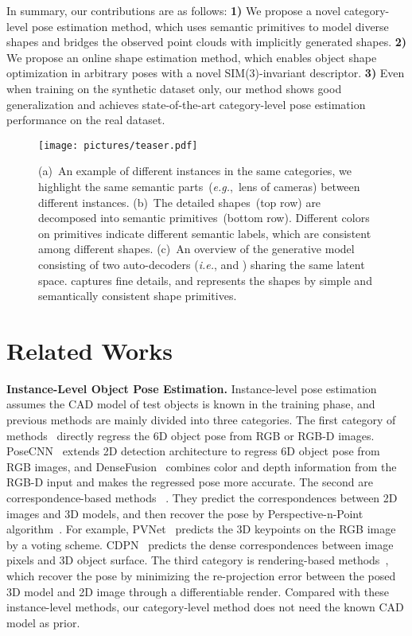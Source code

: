 \documentclass{article}
\begin{document}
In summary, our contributions are as follows:
\textbf{1)}
We propose a novel category-level pose estimation method, which uses semantic primitives to model diverse shapes and bridges the observed point clouds with implicitly generated shapes.
\textbf{2)}
We propose an online shape estimation method, which enables object shape optimization in arbitrary poses with a novel SIM(3)-invariant descriptor.
\textbf{3)}
Even when training on the synthetic dataset only, our method shows good generalization and achieves state-of-the-art category-level pose estimation performance on the real dataset.

\begin{figure}
    \centering
    \setlength{\abovecaptionskip}{0.cm}
    \texttt{[image: pictures/teaser.pdf]}
    \caption{(a)~An example of different instances in the same categories, we highlight the same semantic parts~(\emph{e.g.},~lens of cameras) between different instances.
    (b)~The detailed shapes~(top row) are decomposed into semantic primitives~(bottom row). Different colors on primitives indicate different semantic labels, which are consistent among different shapes.
    (c)~An overview of the generative model consisting of two auto-decoders (\emph{i.e.},  and ) sharing the same latent space.  captures fine details, and  represents the shapes by simple and semantically consistent shape primitives. }
    \label{fig:teaser}
\vspace{-0.4cm}
\end{figure}
 \section{Related Works}
\textbf{Instance-Level Object Pose Estimation.}
Instance-level pose estimation assumes the CAD model of test objects is known in the training phase, and previous methods are mainly divided into three categories. The first category of methods~\cite{schwarz2015rgb,wang2019densefusion,xiang2017posecnn,kehl2017ssd} directly regress the 6D object pose from RGB or RGB-D images. PoseCNN~\cite{xiang2017posecnn} extends 2D detection architecture to regress 6D object pose from RGB images, and DenseFusion~\cite{wang2019densefusion} combines color and depth information from the RGB-D input and makes the regressed pose more accurate. The second are correspondence-based methods ~\cite{peng2019pvnet,he2020pvn3d,li2019cdpn,oberweger2018making}. They predict the correspondences between 2D images and 3D models, and then recover the pose by Perspective-n-Point algorithm~\cite{lepetit2009epnp}. For example, PVNet~\cite{peng2019pvnet} predicts the 3D keypoints on the RGB image by a voting scheme. CDPN~\cite{li2019cdpn} predicts the dense correspondences between image pixels and 3D object surface. The third category is rendering-based methods~\cite{park2020latentfusion,yen2021inerf}, which recover the pose by minimizing the re-projection error between the posed 3D model and 2D image through a differentiable render. Compared with these instance-level methods, our category-level method does not need the known CAD model as prior.
\end{document}
